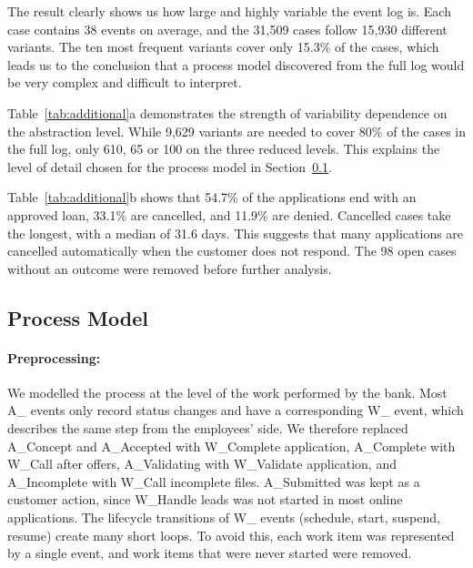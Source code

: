 \documentclass[
  english,        %
  font=times,     %
  twocolumn,      %
]{tumarticle}
\let\oldsubsection\subsection
\renewcommand{\subsection}{\FloatBarrier\oldsubsection}
\begin{document}
The result clearly shows us how large and highly variable the event log is. Each case contains 38 events on average, and the 31,509 cases follow 15,930 different variants. The ten most frequent variants cover only 15.3\% of the cases, which leads us to the conclusion that a process model discovered from the full log would be very complex and difficult to interpret.

\begin{table}[!htb]
    \caption{Additional statistics: (a) number of variants and share of cases covered by the most frequent variants; (b) case outcome and case duration.}
    \label{tab:additional}
    \centering
    \footnotesize
    \setlength{\tabcolsep}{1.5pt}
    
\end{table}

Table~\ref{tab:additional}a demonstrates the strength of variability dependence on the abstraction level. While 9,629 variants are needed to cover 80\% of the cases in the full log, only 610, 65 or 100 on the three reduced levels. This explains the level of detail chosen for the process model in Section~\ref{sec:model}.

Table~\ref{tab:additional}b shows that 54.7\% of the applications end with an approved loan, 33.1\% are cancelled, and 11.9\% are denied. Cancelled cases take the longest, with a median of 31.6 days. This suggests that many applications are cancelled automatically when the customer does not respond. The 98 open cases without an outcome were removed before further analysis.

\subsection{Process Model}
\label{sec:model}
\paragraph{Preprocessing:}
We modelled the process at the level of the work performed by the bank. Most A\_ events only record status changes and have a corresponding W\_ event, which describes the same step from the employees' side. We therefore replaced A\_Concept and A\_Accepted with W\_Complete application, A\_Complete with W\_Call after offers, A\_Validating with W\_Validate application, and A\_Incomplete with W\_Call incomplete files. A\_Submitted was kept as a customer action, since W\_Handle leads was not started in most online applications. The lifecycle transitions of W\_ events (schedule, start, suspend, resume) create many short loops. To avoid this, each work item was represented by a single event, and work items that were never started were removed.
\end{document}
